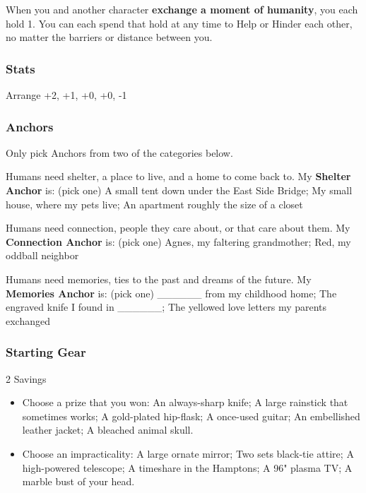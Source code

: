 \documentclass[
]{article}
\providecommand{\tightlist}{%
  \setlength{\itemsep}{0pt}\setlength{\parskip}{0pt}}
\begin{document}
When you and another character \textbf{exchange a moment of humanity},
you each hold 1. You can each spend that hold at any time to Help or
Hinder each other, no matter the barriers or distance between you.

\hypertarget{stats-6}{%
\subsubsection{Stats}\label{stats-6}}

Arrange +2, +1, +0, +0, -1

\hypertarget{anchors-5}{%
\subsubsection{Anchors}\label{anchors-5}}

Only pick Anchors from two of the categories below.

Humans need shelter, a place to live, and a home to come back to. My
\textbf{Shelter Anchor} is: (pick one) A small tent down under the East
Side Bridge; My small house, where my pets live; An apartment roughly
the size of a closet

Humans need connection, people they care about, or that care about them.
My \textbf{Connection Anchor} is: (pick one) Agnes, my faltering
grandmother; Red, my oddball neighbor

Humans need memories, ties to the past and dreams of the future. My
\textbf{Memories Anchor} is: (pick one) \_\_\_\_\_\_ from my childhood
home; The engraved knife I found in \_\_\_\_\_\_; The yellowed love
letters my parents exchanged

\hypertarget{starting-gear-5}{%
\subsubsection{Starting Gear}\label{starting-gear-5}}

2 Savings

\begin{itemize}
\tightlist
\item
  Choose a prize that you won: An always-sharp knife; A large rainstick
  that sometimes works; A gold-plated hip-flask; A once-used guitar; An
  embellished leather jacket; A bleached animal skull.
\item
  Choose an impracticality: A large ornate mirror; Two sets black-tie
  attire; A high-powered telescope; A timeshare in the Hamptons; A 96"
  plasma TV; A marble bust of your head.
\end{itemize}
\end{document}
